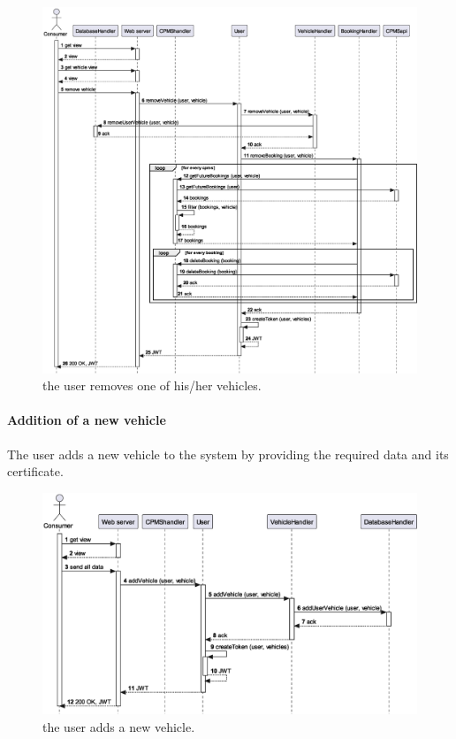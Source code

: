 \begin{figure}[h!]
    \centering
    \includegraphics[width=\columnwidth]{./images/sequences/emsp/vehicle_delete}
    \caption{the user removes one of his/her vehicles.}
\end{figure}

\pagebreak

\paragraph{Addition of a new vehicle} The user adds a new vehicle to the system by providing the required data and its certificate.

\begin{figure}[h!]
    \centering
    \includegraphics[width=\columnwidth]{./images/sequences/emsp/vehicle_add}
    \caption{the user adds a new vehicle.}
\end{figure}


